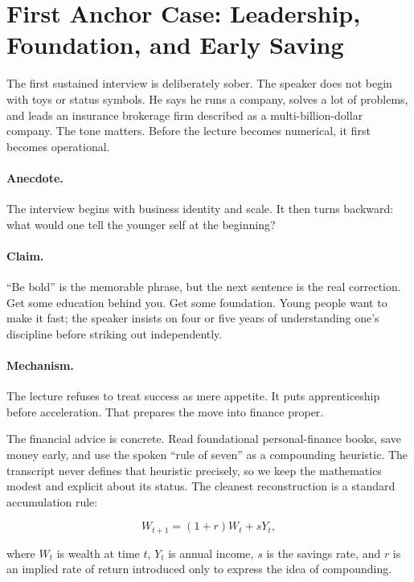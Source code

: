 \section{First Anchor Case: Leadership, Foundation, and Early Saving}

The first sustained interview is deliberately sober. The speaker does not begin with toys or status symbols. He says he runs a company, solves a lot of problems, and leads an insurance brokerage firm described as a multi-billion-dollar company. The tone matters. Before the lecture becomes numerical, it first becomes operational.

\paragraph{Anecdote.} The interview begins with business identity and scale. It then turns backward: what would one tell the younger self at the beginning?

\paragraph{Claim.} ``Be bold'' is the memorable phrase, but the next sentence is the real correction. Get some education behind you. Get some foundation. Young people want to make it fast; the speaker insists on four or five years of understanding one's discipline before striking out independently.

\paragraph{Mechanism.} The lecture refuses to treat success as mere appetite. It puts apprenticeship before acceleration. That prepares the move into finance proper.

The financial advice is concrete. Read foundational personal-finance books, save money early, and use the spoken ``rule of seven'' as a compounding heuristic. The transcript never defines that heuristic precisely, so we keep the mathematics modest and explicit about its status. The cleanest reconstruction is a standard accumulation rule:

\begin{equation}
W_{t+1} = (1+r)W_t + sY_t,
\end{equation}

where \(W_t\) is wealth at time \(t\), \(Y_t\) is annual income, \(s\) is the savings rate, and \(r\) is an implied rate of return introduced only to express the idea of compounding.

